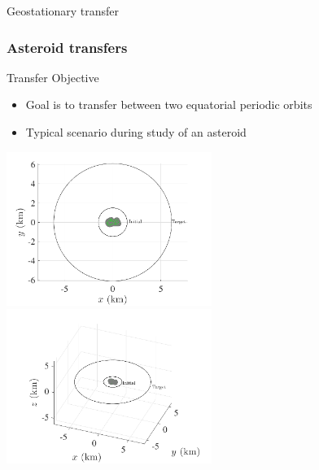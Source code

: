 \begin{frame}{Geostationary  transfer}
\end{frame} %

\subsubsection[Transfers about 4769 Castalia]{Asteroid transfers}

\begin{frame}{Transfer Objective} %

\begin{itemize}
    \item Goal is to transfer between two equatorial periodic orbits
    \item Typical scenario during study of an asteroid
\end{itemize}

\begin{center}
    \includegraphics[width=0.5\textwidth,height=0.7\textheight,keepaspectratio]{figures/2016AAS/initial_transfer.pdf}~
    \includegraphics[width=0.5\textwidth,height=0.7\textheight,keepaspectratio]{figures/2016AAS/initial_transfer_3d.pdf}
\end{center}

\end{frame}%

